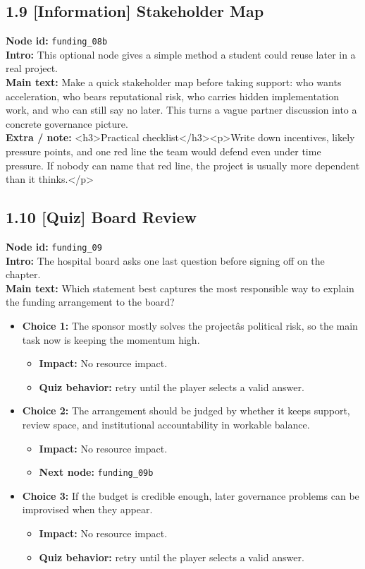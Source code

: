 \documentclass[11pt]{article}
\begin{document}
\subsection*{1.9 [Information] Stakeholder Map}
\textbf{Node id:} \texttt{funding\_08b}\\
\textbf{Intro:} This optional node gives a simple method a student could reuse later in a real project.\\
\textbf{Main text:} Make a quick stakeholder map before taking support: who wants acceleration, who bears reputational risk, who carries hidden implementation work, and who can still say no later. This turns a vague partner discussion into a concrete governance picture.\\
\textbf{Extra / note:} <h3>Practical checklist</h3><p>Write down incentives, likely pressure points, and one red line the team would defend even under time pressure. If nobody can name that red line, the project is usually more dependent than it thinks.</p>\\
\subsection*{1.10 [Quiz] Board Review}
\textbf{Node id:} \texttt{funding\_09}\\
\textbf{Intro:} The hospital board asks one last question before signing off on the chapter.\\
\textbf{Main text:} Which statement best captures the most responsible way to explain the funding arrangement to the board?\\
\begin{itemize}
\item \textbf{Choice 1:} The sponsor mostly solves the projectâs political risk, so the main task now is keeping the momentum high.
\begin{itemize}
\item \textbf{Impact:} No resource impact.
\item \textbf{Quiz behavior:} retry until the player selects a valid answer.
\end{itemize}
\item \textbf{Choice 2:} The arrangement should be judged by whether it keeps support, review space, and institutional accountability in workable balance.
\begin{itemize}
\item \textbf{Impact:} No resource impact.
\item \textbf{Next node:} \texttt{funding\_09b}
\end{itemize}
\item \textbf{Choice 3:} If the budget is credible enough, later governance problems can be improvised when they appear.
\begin{itemize}
\item \textbf{Impact:} No resource impact.
\item \textbf{Quiz behavior:} retry until the player selects a valid answer.
\end{itemize}
\end{itemize}
\end{document}
